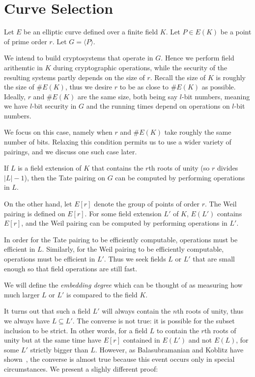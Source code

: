 \chapter{Curve Selection}

Let $E$ be an elliptic curve defined over a finite field $K$.
Let $P \in E(K)$ be a point of prime order $r$. Let $G = \langle P \rangle$.

We intend to build cryptosystems that operate in $G$. Hence
we perform field arithemtic in $K$ during cryptographic operations,
while the security of the resulting systems partly depends on the size of $r$.
Recall the size of $K$ is roughly the size of $\#E(K)$,
thus we desire $r$ to be as close to $\#E(K)$ as possible. Ideally,
$r$ and $\#E(K)$ are the same size, both being say $l$-bit numbers,
meaning we have $l$-bit security
in $G$ and the running times depend on operations on $l$-bit numbers.

We focus on this case, namely when
$r$ and $\#E(K)$ take roughly the same number of
bits. Relaxing this condition
permits us to use a wider variety of pairings, and we discuss one
such case later.

If $L$ is a field extension of $K$
that contains the $r$th roots of unity (so $r$ divides $|L| - 1$),
then the Tate pairing
on $G$ can be computed by performing operations in $L$.

On the other hand, let $E[r]$ denote the group of points of order $r$.
The Weil pairing is defined on $E[r]$. For some field extension
$L'$ of $K$, $E(L')$ contains $E[r]$, and the Weil pairing can be
computed by performing operations in $L'$.

In order for the Tate pairing to be efficiently computable,
operations must be efficient in $L$.
Similarly, for the Weil pairing to be efficiently
computable, operations must be efficient in $L'$.
Thus we seek fields $L$ or $L'$ that are small enough so that field
operations are still fast.

We will define the \emph{embedding degree} which can be thought of as measuring
how much larger $L$ or $L'$ is compared to the field $K$.

It turns out that such a field $L'$ will always contain the $n$th
roots of unity, thus we always have $L \subseteq L'$.
The converse is not true: it is possible for the subset inclusion to be strict.
In other words, for a field $L$ to contain the $r$th roots of unity but
at the same time have $E[r]$ contained in $E(L')$ and not $E(L)$, for
some $L'$ strictly bigger than $L$.
However, as Balasubramanian and Koblitz have shown~\cite{bk},
the converse is almost true because this event occurs only in
special circumstances. We present a slighly different proof:

